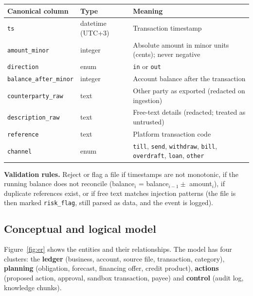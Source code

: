 \documentclass[10pt,a4paper]{article}
\newcommand{\code}[1]{\texttt{\small #1}}
\begin{document}
\begin{center}
\begin{tabularx}{\textwidth}{@{}p{3.4cm}p{2.7cm}Y@{}}
\toprule
\textbf{Canonical column} & \textbf{Type} & \textbf{Meaning}\\
\midrule
\code{ts} & datetime (UTC+3) & Transaction timestamp\\
\code{amount\_minor} & integer & Absolute amount in minor units (cents); never negative\\
\code{direction} & enum & \code{in} or \code{out}\\
\code{balance\_after\_minor} & integer & Account balance after the transaction\\
\code{counterparty\_raw} & text & Other party as exported (redacted on ingestion)\\
\code{description\_raw} & text & Free-text details (redacted; treated as untrusted)\\
\code{reference} & text & Platform transaction code\\
\code{channel} & enum & \code{till}, \code{send}, \code{withdraw}, \code{bill}, \code{overdraft}, \code{loan}, \code{other}\\
\bottomrule
\end{tabularx}
\end{center}

\textbf{Validation rules.} Reject or flag a file if timestamps are not monotonic, if the running balance does not reconcile (balance$_{i}$ = balance$_{i-1} \pm$ amount$_i$), if duplicate references exist, or if free text matches injection patterns (the file is then marked \code{risk\_flag}, still parsed as data, and the event is logged).

\subsection{Conceptual and logical model}
Figure~\ref{fig:er} shows the entities and their relationships. The model has four clusters: the \textbf{ledger} (business, account, source file, transaction, category), \textbf{planning} (obligation, forecast, financing offer, credit product), \textbf{actions} (proposed action, approval, sandbox transaction, payee) and \textbf{control} (audit log, knowledge chunks).
\end{document}
